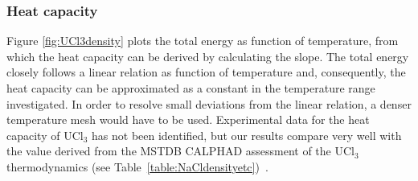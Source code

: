 \documentclass[titlepage=firstiscover,11pt,fleqn,headheight=14pt,footheight=40.8pt]{scrreprt}
\begin{document}
\subsubsection{Heat capacity} 
Figure \ref{fig:UCl3density} plots the total energy as function of temperature, from which the heat capacity can be derived by calculating the slope. The total energy closely follows a linear relation as function of temperature and, consequently, the heat capacity can be approximated as a constant in the temperature range investigated. In order to resolve small deviations from the linear relation, a denser temperature mesh would have to be used. 
Experimental data for the heat capacity of UCl$_3$ has not been identified, but our results compare very well with the value derived from the MSTDB CALPHAD assessment of the UCl$_3$ thermodynamics (see Table~\ref{table:NaCldensityetc})~\cite{McMurray}. %


\end{document}
